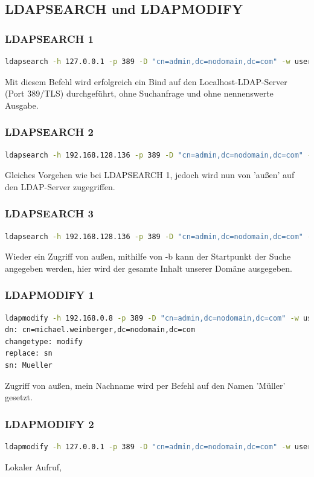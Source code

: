 \documentclass[letterpaper, 12pt]{article}
\let\tempsubsection\subsection
\renewcommand\subsection[1]{\vspace{0cm}\tempsubsection{#1}\vspace{0cm}}
\let\tempsubsubsection\subsubsection
\renewcommand\subsubsection[1]{\vspace{0cm}\tempsubsubsection{#1}\vspace{0cm}}
\begin{document}
\subsection{LDAPSEARCH und LDAPMODIFY}
\subsubsection{LDAPSEARCH 1}
\begin{lstlisting}[frame=single, language=bash, caption=1.Befehl]
ldapsearch -h 127.0.0.1 -p 389 -D "cn=admin,dc=nodomain,dc=com" -w user
\end{lstlisting} 
Mit diesem Befehl wird erfolgreich ein Bind auf den Localhost-LDAP-Server (Port 389/TLS) durchgeführt, ohne Suchanfrage und ohne nennenswerte Ausgabe.
\subsubsection{LDAPSEARCH 2}
\begin{lstlisting}[frame=single, language=bash, caption=2.Befehl]
ldapsearch -h 192.168.128.136 -p 389 -D "cn=admin,dc=nodomain,dc=com" -w user
\end{lstlisting} 
Gleiches Vorgehen wie bei LDAPSEARCH 1, jedoch wird nun von 'außen' auf den LDAP-Server zugegriffen.
\subsubsection{LDAPSEARCH 3}
\begin{lstlisting}[frame=single, language=bash, caption=3.Befehl]
ldapsearch -h 192.168.128.136 -p 389 -D "cn=admin,dc=nodomain,dc=com" -w user -b "dc=nodomain,dc=com"
\end{lstlisting} 
Wieder ein Zugriff von außen, mithilfe von -b kann der Startpunkt der Suche angegeben werden, hier wird der gesamte Inhalt unserer Domäne ausgegeben.
\subsubsection{LDAPMODIFY 1}
\begin{lstlisting}[frame=single, language=bash, caption=4.Befehl]
ldapmodify -h 192.168.0.8 -p 389 -D "cn=admin,dc=nodomain,dc=com" -w user
dn: cn=michael.weinberger,dc=nodomain,dc=com
changetype: modify
replace: sn
sn: Mueller
\end{lstlisting} 
Zugriff von außen, mein Nachname wird per Befehl auf den Namen 'Müller' gesetzt.
\subsubsection{LDAPMODIFY 2}
\begin{lstlisting}[frame=single, language=bash, caption=5.Befehl]
ldapmodify -h 127.0.0.1 -p 389 -D "cn=admin,dc=nodomain,dc=com" -w user -f /home/user/Documents/SYT/
\end{lstlisting} 
Lokaler Aufruf, 
\newpage



\lstlistoflistings
\listoffigures
\end{document}
